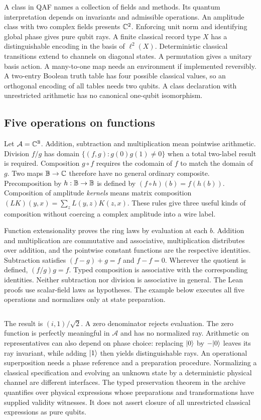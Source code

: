A class in QAF names a collection of fields and methods. Its quantum interpretation depends on invariants and admissible operations. An amplitude class with two complex fields presents $\mathbb C^2$. Enforcing unit norm and identifying global phase gives pure qubit rays. A finite classical record type $X$ has a distinguishable encoding in the basis of $\ell^2(X)$. Deterministic classical transitions extend to channels on diagonal states. A permutation gives a unitary basis action. A many-to-one map needs an environment if implemented reversibly. A two-entry Boolean truth table has four possible classical values, so an orthogonal encoding of all tables needs two qubits. A class declaration with unrestricted arithmetic has no canonical one-qubit isomorphism.

\subsection{Five operations on functions}
Let $\mathcal A=\mathbb C^\mathbb B$. Addition, subtraction and multiplication mean pointwise arithmetic. Division $f/g$ has domain $\{(f,g):g(0)g(1)\ne0\}$ when a total two-label result is required. Composition $g\circ f$ requires the codomain of $f$ to match the domain of $g$. Two maps $\mathbb B\to\mathbb C$ therefore have no general ordinary composite. Precomposition by $h:\mathbb B\to\mathbb B$ is defined by $(f\circ h)(b)=f(h(b))$. Composition of amplitude \emph{kernels} means matrix composition $(LK)(y,x)=\sum_z L(y,z)K(z,x)$. These rules give three useful kinds of composition without coercing a complex amplitude into a wire label.

Function extensionality proves the ring laws by evaluation at each $b$. Addition and multiplication are commutative and associative, multiplication distributes over addition, and the pointwise constant functions are the respective identities. Subtraction satisfies $(f-g)+g=f$ and $f-f=0$. Wherever the quotient is defined, $(f/g)g=f$. Typed composition is associative with the corresponding identities. Neither subtraction nor division is associative in general. The Lean proofs use scalar-field laws as hypotheses. The example below executes all five operations and normalizes only at state preparation.
\inputminted[firstline=55,fontsize=\footnotesize]{qaf}{../../examples/prefix/algebra.qaf}
The result is $(i,1)/\sqrt2$. A zero denominator rejects evaluation. The zero function is perfectly meaningful in $\mathcal A$ and has no normalized ray. Arithmetic on representatives can also depend on phase choice: replacing $\lvert 0\rangle$ by $-\lvert 0\rangle$ leaves its ray invariant, while adding $\lvert 1\rangle$ then yields distinguishable rays. An operational superposition needs a phase reference and a preparation procedure. Normalizing a classical specification and evolving an unknown state by a deterministic physical channel are different interfaces. The typed preservation theorem in the archive quantifies over physical expressions whose preparations and transformations have supplied validity witnesses. It does not assert closure of all unrestricted classical expressions as pure qubits.

